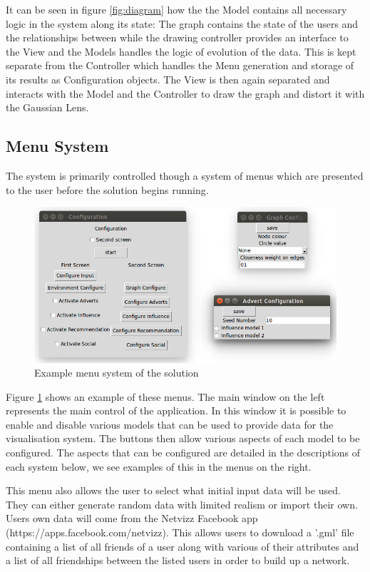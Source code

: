 \documentclass[12pt,a4paper]{article}
\begin{document}
It can be seen in figure \ref{fig:diagram} how the the Model contains all necessary logic in the system along its state: The graph contains the state of the users and the relationships between while the drawing controller provides an interface to the View and the Models handles the logic of evolution of the data. This is kept separate from the Controller which handles the Menu generation and storage of its results as Configuration objects. The View is then again separated and interacts with the Model and the Controller to draw the graph and distort it with the Gaussian Lens.

\subsection{Menu System}
\noindent
The system is primarily controlled though a system of menus which are presented to the user before the solution begins running.

\begin{figure}[htb]
\centering
\caption{Example menu system of the solution}
\label{fig:menu}
\includegraphics[scale=0.5]{MenuShot.png}
\end{figure}

Figure \ref{fig:menu} shows an example of these menus. The main window on the left represents the main control of the application. In this window it is possible to enable and disable various models that can be used to provide data for the visualisation system. The buttons then allow various aspects of each model to be configured. The aspects that can be configured are detailed in the descriptions of each system below, we see examples of this in the menus on the right.

This menu also allows the user to select what initial input data will be used. They can either generate random data with limited realism or import their own. Users own data will come from the Netvizz Facebook app (https://apps.facebook.com/netvizz). This allows users to download a '.gml' file containing a list of all friends of a user along with various of their attributes and a list of all friendships between the listed users in order to build up a network.
\end{document}
